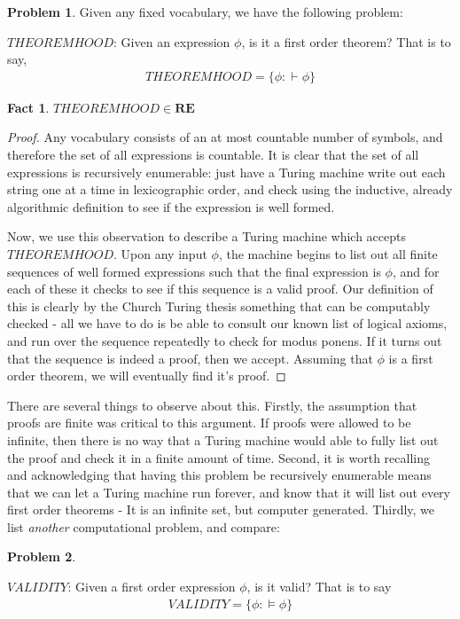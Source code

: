 \documentclass{article}
\theoremstyle{definition}
\newtheorem{problem}{Problem}
\theoremstyle{plain}
\theoremstyle{theorem}
\newtheorem{fact}{Fact}[section]
\begin{document}
\begin{problem}
    Given any fixed vocabulary, we have the following problem:
    \begin{center}
        $THEOREMHOOD$: Given an expression $\phi$, is it a first order theorem? That is to say,
        \begin{align}
            THEOREMHOOD = \{\phi: \vdash \phi\} 
        \end{align}
    \end{center}
\end{problem}
\begin{fact}
    $THEOREMHOOD \in \textbf{RE}$
\end{fact}
\begin{proof}
    Any vocabulary consists of an at most countable number of symbols, and therefore the set of all expressions is countable. It is clear that the set of all expressions is recursively enumerable: just have a Turing machine write out each string one at a time in lexicographic order, and check using the inductive, already algorithmic definition to see if the expression is well formed. 
    \par Now, we use this observation to describe a Turing machine which accepts $THEOREMHOOD$. Upon any input $\phi$, the machine begins to list out all finite sequences of well formed expressions such that the final expression is $\phi$, and for each of these it checks to see if this sequence is a valid proof. Our definition of this is clearly by the Church Turing thesis something that can be computably checked - all we have to do is be able to consult our known list of logical axioms, and run over the sequence repeatedly to check for modus ponens. If it turns out that the sequence is indeed a proof, then we accept. Assuming that $\phi$ is a first order theorem, we will eventually find it's proof.
\end{proof}
There are several things to observe about this. Firstly, the assumption that proofs are finite was critical to this argument. If proofs were allowed to be infinite, then there is no way that a Turing machine would able to fully list out the proof and check it in a finite amount of time. Second, it is worth recalling and acknowledging that having this problem be recursively enumerable means that we can let a Turing machine run forever, and know that it will list out every first order theorems - It is an infinite set, but computer generated. Thirdly, we list \textit{another} computational problem, and compare:
\begin{problem}
    \begin{center}
        $VALIDITY$: Given a first order expression $\phi$, is it valid? That is to say
        \begin{align}
            VALIDITY = \{\phi: \models  \phi  \}
        \end{align}
    \end{center}
\end{problem}
\end{document}
